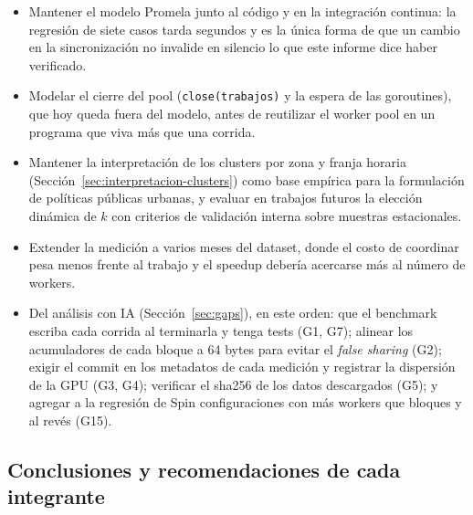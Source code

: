 \begin{itemize}
  \item Mantener el modelo Promela junto al código y en la integración continua: la regresión de
        siete casos tarda segundos y es la única forma de que un cambio en la sincronización no
        invalide en silencio lo que este informe dice haber verificado.
  \item Modelar el cierre del pool (\texttt{close(trabajos)} y la espera de las goroutines), que hoy
        queda fuera del modelo, antes de reutilizar el worker pool en un programa que viva más que
        una corrida.
  \item Mantener la interpretación de los clusters por zona y franja horaria
        (Sección~\ref{sec:interpretacion-clusters}) como base empírica para la formulación de
        políticas públicas urbanas, y evaluar en trabajos futuros la elección dinámica de $k$ con
        criterios de validación interna sobre muestras estacionales.
  \item Extender la medición a varios meses del dataset, donde el costo de coordinar pesa menos
        frente al trabajo y el speedup debería acercarse más al número de workers.
  \item Del análisis con IA (Sección~\ref{sec:gaps}), en este orden: que el benchmark escriba cada
        corrida al terminarla y tenga tests (G1, G7); alinear los acumuladores de cada bloque a
        64 bytes para evitar el \emph{false sharing} (G2); exigir el commit en los metadatos de cada
        medición y registrar la dispersión de la GPU (G3, G4); verificar el sha256 de los datos
        descargados (G5); y agregar a la regresión de Spin configuraciones con más workers que
        bloques y al revés (G15).
\end{itemize}

\subsection{Conclusiones y recomendaciones de cada integrante}\label{sec:conclusiones-integrantes}





